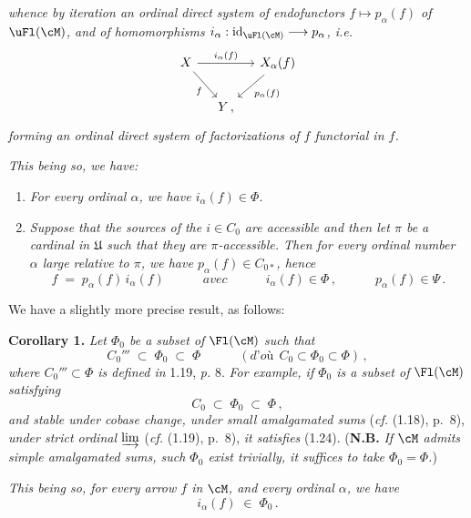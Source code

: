 
{\itshape whence by iteration an ordinal direct system of endofunctors $f\longmapsto p_\alpha(f)$ of $\uFl(\cM)$, and of homomorphisms $i_\alpha : \mathrm{id}_{\uFl(\cM)} \longrightarrow p_\alpha$, \textup{i.e.}}
\[
\begin{tikzcd}[column sep=small]
X \arrow[rr, "i_\alpha(f)"] \arrow[dr, "f"'] & & X_\alpha(f) \arrow[dl, "p_\alpha(f)"] \\
& Y\,, &
\end{tikzcd}
\]
{\itshape forming an ordinal direct system of factorizations of $f$ functorial in $f$.}


{\itshape This being so, we have:}
\begin{enumerate}[label={}, leftmargin=*]
\item[a)] {\itshape For every ordinal $\alpha$, we have $i_\alpha(f)\in\Phi$.}
\item[b)] {\itshape Suppose that the sources of the $i\in C_0$ are accessible and then let $\pi$ be a cardinal in $\mathfrak{U}$ such that they are $\pi$-accessible. Then for every ordinal number $\alpha$ large relative to $\pi$, we have $p_\alpha(f)\in C_{0*}$, hence}
\[
f \;=\; p_\alpha(f)\, i_\alpha(f) \qquad\quad \textit{avec} \qquad\quad i_\alpha(f)\in\Phi\,, \qquad\quad p_\alpha(f)\in\Psi\,.
\]
\end{enumerate}

We have a slightly more precise result, as follows:

\textbf{Corollary 1.} \textit{Let $\Phi_0$ be a subset of} $\Fl(\cM)$ \textit{such that}
\[
C_0''' \;\subset\; \Phi_0 \;\subset\; \Phi \qquad\quad (\textit{d'où}\ \ C_0\subset\Phi_0\subset\Phi)\,,
\tag*{(1.24)}
\]
\textit{where $C_0'''\subset\Phi$ is defined in} 1.19, \textit{p.} 8. \textit{For example, if $\Phi_0$ is a subset of} $\Fl(\cM)$ \textit{satisfying}
\[
C_0 \;\subset\; \Phi_0 \;\subset\; \Phi\,,
\]
\textit{and stable under cobase change, under small amalgamated sums} (\textit{cf.} (1.18), p.~8), \textit{under strict ordinal $\varinjlim$} (\textit{cf.} (1.19), p.~8), \textit{it satisfies} (1.24). (\textbf{N.B.} \textit{If $\cM$ admits simple amalgamated sums, such $\Phi_0$ exist trivially, it suffices to take $\Phi_0=\Phi$.})


\textit{This being so, for every arrow $f$ in $\cM$, and every ordinal $\alpha$, we have}
\[
i_\alpha(f) \;\in\; \Phi_0\,.
\]

